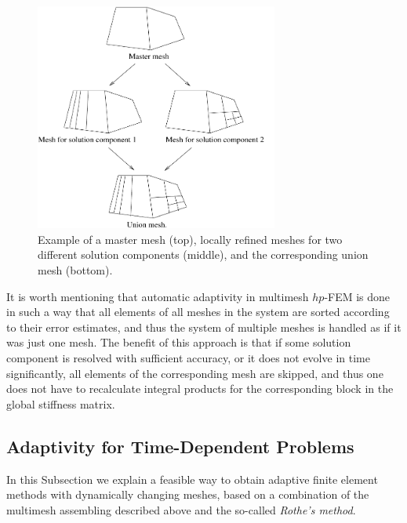 \documentclass[final,3p,times,twocolumn]{elsarticle}
\begin{document}
\begin{figure}[h]
  \smallskip
  \centering
  \includegraphics[width=8cm]{multi.pdf}
  \vspace{-4mm}
  \caption{Example of a master mesh (top), locally refined 
           meshes for two different solution components (middle),
           and the corresponding union mesh (bottom).}
  \label{fig:multimesh}
\end{figure}

It is worth mentioning that automatic adaptivity in multimesh 
$hp$-FEM is done in such a way that all elements of all meshes 
in the system are sorted according to their error estimates, 
and thus the system of multiple meshes is handled as if it was
just one mesh. The benefit of this approach is that if some
solution component is resolved with sufficient accuracy, or it 
does not evolve in time significantly, all elements of the 
corresponding mesh are skipped, and thus one does not have to 
recalculate integral products for the corresponding block in 
the global stiffness matrix. 

\subsection{Adaptivity for Time-Dependent Problems}

In this Subsection we explain a feasible way to obtain 
adaptive finite element methods with dynamically changing meshes,
based on a combination of the multimesh assembling described
above and the so-called {\em Rothe's method}.
\end{document}
